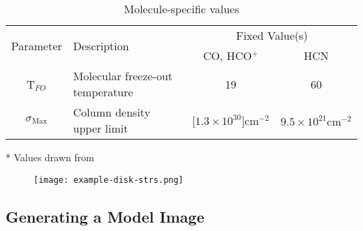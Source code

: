 \begin{table}
  \begin{threeparttable}
    \centering
    \caption{Molecule-specific values}
    \label{tab:mol_specifics}
    \renewcommand{\arraystretch}{1.2}
    \begin{tabular}{c  l  c c }
      \toprule \toprule
      \multirow{2}{*}{Parameter} & \multirow{2}{*}{Description}    & \multicolumn{2}{c}{Fixed Value(s)} \\
                                 &                                 & CO, HCO$^+$ & HCN \\
      \midrule %
      T$_{FO}$            &  Molecular freeze-out temperature      &  19 & 60    \\
      $\sigma_\text{Max}$ & Column density upper limit &  [$1.3 \times 10^{30}] \text{cm}^{-2}$ & $9.5 \times 10^{21} \text{cm}^{-2}$  \\
      \bottomrule
    \end{tabular}
    \begin{tablenotes}\footnotesize
      \item[*] Values drawn from \cite{Factor2017}
    \end{tablenotes}
  \end{threeparttable}
\end{table}



\begin{figure}[htp]
\centering
  \texttt{[image: example-disk-strs.png]}
  \label{fig:temp_dens_str}
\end{figure}





\subsection{Generating a Model Image}

